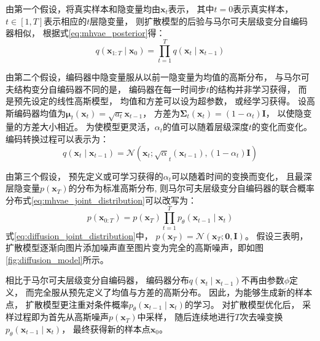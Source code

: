 由第一个假设，将真实样本和隐变量均由{$\bm{x}_{t}$}表示，
其中{$t=0$}表示真实样本，
{$t\in \left[1,T \right]$}表示相应的{$t$}层隐变量，
则扩散模型的后验与马尔可夫层级变分自编码器相似，
根据式{\ref{eq:mhvae_posterior}}得：
\begin{equation}
    \label{eq:diffusion_posterior}
    q(\bm{x}_{1:T} \mid \bm{x}_{0})=\prod_{t=1}^{T}q(\bm{x}_{t}\mid\bm{x}_{t-1})
\end{equation}

由第二个假设，编码器中隐变量服从以前一隐变量为均值的高斯分布，
与马尔可夫结构变分自编码器不同的是，
编码器在每一时间步{$t$}的结构并非学习获得，
而是预先设定的线性高斯模型，
均值和方差可以设为超参数{ {\cite{ho2020denoising}}}，
或经学习获得{ {\cite{kingma2023variational}}}。
设高斯编码器均值为{$\bm{\mu}_{t}(\bm{x}_{t})=\sqrt{a_{t}}\bm{x}_{t-1}$}，
方差为{$\bm{\Sigma}_{t}(\bm{x}_{t}) = (1-\alpha_t)\bm{I}$}，
以使隐变量的方差大小相近。
为使模型更灵活，{$\alpha_t$}的值可以随着层级深度{$t$}的变化而变化。
编码转换过程可以表示为：
\begin{equation}
    \label{eq:diffusion_encoder}
    q(\bm{x}_{t}\mid \bm{x}_{t-1})=\mathcal{N}(\bm{x}_{t}; \sqrt{\alpha}_{t}(\bm{x}_{t-1}), (1-\alpha_t)\bm{I})
\end{equation}

由第三个假设，
预先定义或可学习获得的{$\alpha_t$}可以随着时间的变换而变化，
且最深层隐变量{$p(\bm{x}_T)$}的分布为标准高斯分布,
则马尔可夫层级变分自编码器的联合概率分布式{\ref{eq:mhvae_joint_distribution}}可以改写为：
\begin{equation}
    \label{eq:diffusion_joint_distribution}
    p(\bm{x}_{0:T})=p(\bm{x}_{T})\prod_{t=1}^{T}p_{\theta}(\bm{x}_{t-1}\mid\bm{x}_{t})
\end{equation}
式{\ref{eq:diffusion_joint_distribution}}中，
{$p(\bm{x}_T) = \mathcal{N}(\bm{x}_{T};\bm{0},\bm{I})$}。
假设三表明，扩散模型逐渐向图片添加噪声直至图片变为完全的高斯噪声，即如图{\ref{fig:diffusion_model}}所示。

相比于马尔可夫层级变分自编码器，
编码器分布{$q(\bm{x}_t\mid \bm{x}_{t-1})$}不再由参数{$\phi$}定义，
而完全服从预先定义了均值与方差的高斯分布。
因此，为能够生成新的样本点，
扩散模型更注重对条件概率{$p_{\theta}(\bm{x}_{t-1}\mid \bm{x}_{t})$}的学习。
对扩散模型优化后，
采样过程即为首先从高斯噪声{$p(\bm{x}_T)$}中采样，
随后连续地进行{$T$}次去噪变换{$p_{\theta}(\bm{x}_{t-1}\mid \bm{x}_{t})$}，
最终获得新的样本点{$\bm{x}_{0}$}。

